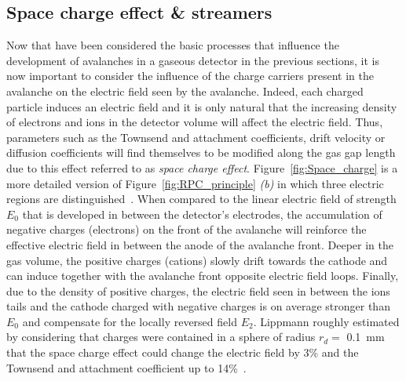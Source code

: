	\subsection{Space charge effect \& streamers}
	\label{chapt4:ssec:space-charge}
	
	Now that have been considered the basic processes that influence the development of avalanches in a gaseous detector in the previous sections, it is now important to consider the influence of the charge carriers present in the avalanche on the electric field seen by the avalanche. Indeed, each charged particle induces an electric field and it is only natural that the increasing density of electrons and ions in the detector volume will affect the electric field. Thus, parameters such as the Townsend and attachment coefficients, drift velocity or diffusion coefficients will find themselves to be modified along the gas gap length due to this effect referred to as \textit{space charge effect}. Figure~\ref{fig:Space_charge} is a more detailed version of Figure~\ref{fig:RPC_principle} \textit{(b)} in which three electric regions are distinguished~\cite{LIPPMANN2003}. When compared to the linear electric field of strength $E_0$ that is developed in between the detector's electrodes, the accumulation of negative charges (electrons) on the front of the avalanche will reinforce the effective electric field in between the anode of the avalanche front. Deeper in the gas volume, the positive charges (cations) slowly drift towards the cathode and can induce together with the avalanche front opposite electric field loops. Finally, due to the density of positive charges, the electric field seen in between the ions tails and the cathode charged with negative charges is on average stronger than $E_0$ and compensate for the locally reversed field $E_2$. Lippmann roughly estimated by considering that  charges were contained in a sphere of radius $r_d =$ \SI{0.1}{mm} that the space charge effect could change the electric field by 3\% and the Townsend and attachment coefficient up to 14\%~\cite{LIPPMANN2003,VINCENT2017}.
	
